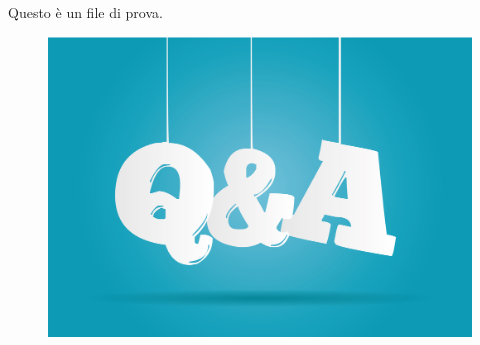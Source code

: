 \documentclass{article}
\begin{document}
	Questo è un file di prova.
	
	\begin{figure}
		\includegraphics[width=0.5\columnwidth]{immagine1}
	\end{figure}
\end{document}
